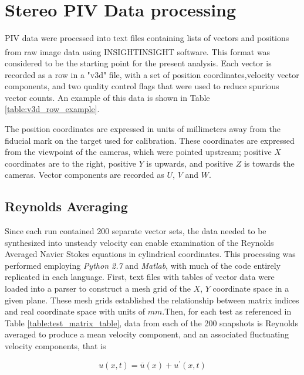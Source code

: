 \section{Stereo PIV Data processing}

PIV data were processed into text files containing lists of vectors and 
positions from raw image data using 
INSIGHTINSIGHT\textsuperscript{\textcopyright} software. 
This format was considered to be the 
starting point for the present analysis. Each vector is recorded as a row in a 
"v3d" file, with a set of position coordinates,velocity 
vector components, and two quality control flags that were used to reduce 
spurious vector counts. An example of this data is shown in Table 
\ref{table:v3d_row_example}.



The position coordinates are expressed in units of millimeters away from 
the fiducial mark on the target used for calibration. These coordinates are 
expressed from the viewpoint of the cameras, which were pointed upstream; 
positive $X$ coordinates are to the right, positive $Y$ is upwards, and 
positive $Z$ is towards the cameras. Vector components are recorded as $U$, 
$V$ and $W$. 

\subsection{Reynolds Averaging}
Since each run contained 200 separate vector sets, the data needed to be 
synthesized into unsteady velocity can enable examination of the Reynolds 
Averaged Navier Stokes equations in cylindrical coordinates. This processing 
was performed employing \textit{Python 2.7} and 
\textit{Matlab}, with much of the code entirely replicated in each language. 
First, text files with tables of vector data were loaded into a parser to 
construct a mesh grid of the $X$, $Y$ coordinate space in a given plane. These 
mesh grids established the relationship between matrix indices and real 
coordinate space with units of $mm$.Then, for each test as referenced in Table 
\ref{table:test_matrix_table}, data from 
each of the 200 snapshots is Reynolds averaged to produce a mean velocity 
component, and an associated fluctuating velocity components, that is

\begin{equation}
u(x,t) = \overline{u}(x) + u^\prime(x,t)
\label{eq:rans_components}
\end{equation}


